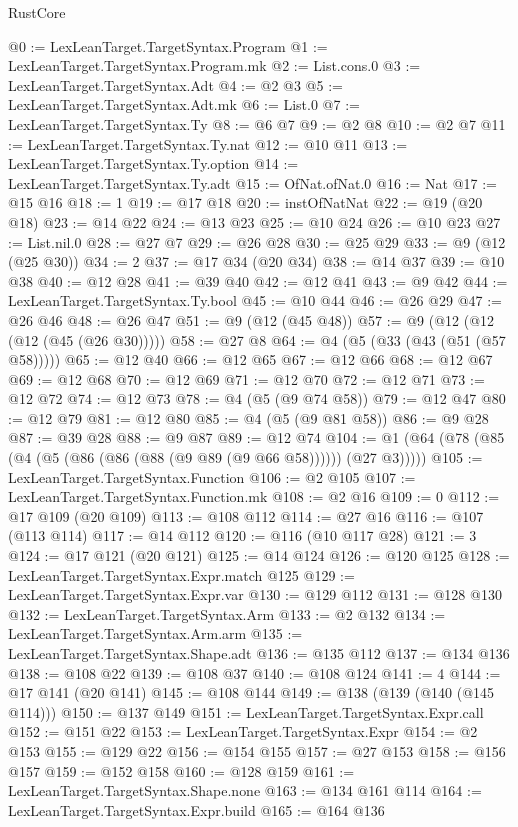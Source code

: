 \begin{lexlean}{RustCore}
\begin{coremodule}
@0 := LexLeanTarget.TargetSyntax.Program
@1 := LexLeanTarget.TargetSyntax.Program.mk
@2 := List.cons.{0}
@3 := LexLeanTarget.TargetSyntax.Adt
@4 := @2 @3
@5 := LexLeanTarget.TargetSyntax.Adt.mk
@6 := List.{0}
@7 := LexLeanTarget.TargetSyntax.Ty
@8 := @6 @7
@9 := @2 @8
@10 := @2 @7
@11 := LexLeanTarget.TargetSyntax.Ty.nat
@12 := @10 @11
@13 := LexLeanTarget.TargetSyntax.Ty.option
@14 := LexLeanTarget.TargetSyntax.Ty.adt
@15 := OfNat.ofNat.{0}
@16 := Nat
@17 := @15 @16
@18 := 1
@19 := @17 @18
@20 := instOfNatNat
@22 := @19 (@20 @18)
@23 := @14 @22
@24 := @13 @23
@25 := @10 @24
@26 := @10 @23
@27 := List.nil.{0}
@28 := @27 @7
@29 := @26 @28
@30 := @25 @29
@33 := @9 (@12 (@25 @30))
@34 := 2
@37 := @17 @34 (@20 @34)
@38 := @14 @37
@39 := @10 @38
@40 := @12 @28
@41 := @39 @40
@42 := @12 @41
@43 := @9 @42
@44 := LexLeanTarget.TargetSyntax.Ty.bool
@45 := @10 @44
@46 := @26 @29
@47 := @26 @46
@48 := @26 @47
@51 := @9 (@12 (@45 @48))
@57 := @9 (@12 (@12 (@12 (@45 (@26 @30)))))
@58 := @27 @8
@64 := @4 (@5 (@33 (@43 (@51 (@57 @58)))))
@65 := @12 @40
@66 := @12 @65
@67 := @12 @66
@68 := @12 @67
@69 := @12 @68
@70 := @12 @69
@71 := @12 @70
@72 := @12 @71
@73 := @12 @72
@74 := @12 @73
@78 := @4 (@5 (@9 @74 @58))
@79 := @12 @47
@80 := @12 @79
@81 := @12 @80
@85 := @4 (@5 (@9 @81 @58))
@86 := @9 @28
@87 := @39 @28
@88 := @9 @87
@89 := @12 @74
@104 := @1 (@64 (@78 (@85 (@4 (@5 (@86 (@86 (@88 (@9 @89 (@9 @66 @58)))))) (@27 @3)))))
@105 := LexLeanTarget.TargetSyntax.Function
@106 := @2 @105
@107 := LexLeanTarget.TargetSyntax.Function.mk
@108 := @2 @16
@109 := 0
@112 := @17 @109 (@20 @109)
@113 := @108 @112
@114 := @27 @16
@116 := @107 (@113 @114)
@117 := @14 @112
@120 := @116 (@10 @117 @28)
@121 := 3
@124 := @17 @121 (@20 @121)
@125 := @14 @124
@126 := @120 @125
@128 := LexLeanTarget.TargetSyntax.Expr.match @125
@129 := LexLeanTarget.TargetSyntax.Expr.var
@130 := @129 @112
@131 := @128 @130
@132 := LexLeanTarget.TargetSyntax.Arm
@133 := @2 @132
@134 := LexLeanTarget.TargetSyntax.Arm.arm
@135 := LexLeanTarget.TargetSyntax.Shape.adt
@136 := @135 @112
@137 := @134 @136
@138 := @108 @22
@139 := @108 @37
@140 := @108 @124
@141 := 4
@144 := @17 @141 (@20 @141)
@145 := @108 @144
@149 := @138 (@139 (@140 (@145 @114)))
@150 := @137 @149
@151 := LexLeanTarget.TargetSyntax.Expr.call
@152 := @151 @22
@153 := LexLeanTarget.TargetSyntax.Expr
@154 := @2 @153
@155 := @129 @22
@156 := @154 @155
@157 := @27 @153
@158 := @156 @157
@159 := @152 @158
@160 := @128 @159
@161 := LexLeanTarget.TargetSyntax.Shape.none
@163 := @134 @161 @114
@164 := LexLeanTarget.TargetSyntax.Expr.build
@165 := @164 @136

\end{coremodule}
\end{lexlean}
